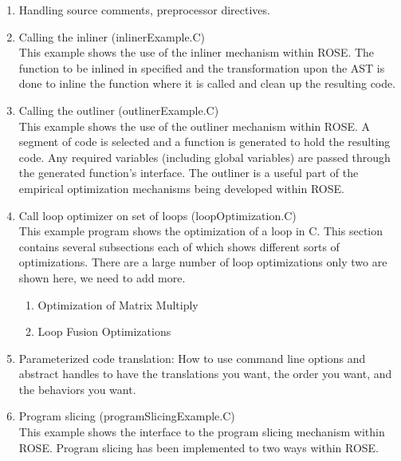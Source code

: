\begin{itemize}
\begin{enumerate}
\begin{enumerate}
       \end{enumerate}

      \item Handling source comments, preprocessor directives. 

     \item Calling the inliner (inlinerExample.C) \\
           This example shows the use of the inliner mechanism within ROSE.
           The function to be inlined in specified and the transformation upon the 
           AST is done to inline the function where it is called and clean up the
           resulting code.

     \item Calling the outliner (outlinerExample.C) \\
           This example shows the use of the outliner mechanism within ROSE.
           A segment of code is selected and a function is generated to 
           hold the resulting code.  Any required variables (including global variables)
           are passed through the generated function's interface.  The outliner is 
           a useful part of the empirical optimization mechanisms being developed 
           within ROSE.

     \item Call loop optimizer on set of loops (loopOptimization.C) \\
           This example program shows the optimization of a loop in C.
           This section contains several subsections each of which shows
           different sorts of optimizations.  There are a large number of
           loop optimizations only two are shown here, we need to add more.
     \begin{enumerate}
          \item Optimization of Matrix Multiply 
          \item Loop Fusion Optimizations
     \end{enumerate}

      \item Parameterized code translation: How to use command line options
      and abstract handles to have the translations you want, the order you
      want, and the behaviors you want.

     \item Program slicing (programSlicingExample.C) \\
           This example shows the interface to the program slicing mechanism 
           within ROSE.  Program slicing has been implemented to two ways within
           ROSE.


\end{enumerate}
\end{itemize}
